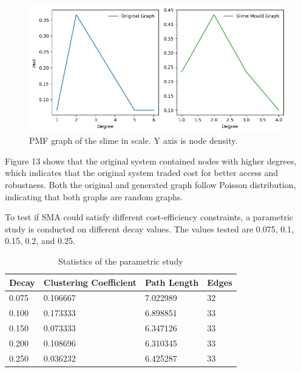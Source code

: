 \documentclass[11pt]{article}
\begin{document}
\begin{figure}[H]
\centering
\includegraphics[width=\linewidth]{pmfslime.png}
\caption{PMF graph of the slime in scale. Y axis is node density.}
\end{figure}
Figure 13 shows that the original system contained nodes with higher degrees, which indicates that the original system traded cost for better access and robustness. Both the original and generated graph follow Poisson distribution, indicating that both graphs are random graphs. \par
To test if SMA could satisfy different cost-efficiency constraints, a parametric study is conducted on different decay values. The values tested are 0.075, 0.1, 0.15, 0.2, and 0.25. \\
\begin{table}[H]
\begin{center}
\begin{tabular}{|l|l|l|l|}
\hline
\textbf{Decay} & \textbf{Clustering Coefficient} & \textbf{Path Length} & \textbf{Edges} \\ \hline
0.075          & 0.106667                        & 7.022989             & 32             \\ \hline
0.100          & 0.173333                        & 6.898851             & 33             \\ \hline
0.150          & 0.073333                        & 6.347126             & 33             \\ \hline
0.200          & 0.108696                        & 6.310345             & 33             \\ \hline
0.250          & 0.036232                        & 6.425287             & 33             \\ \hline
\end{tabular}
\caption{Statistics of the parametric study}
\end{center} 
\end{table} 
\end{document}
